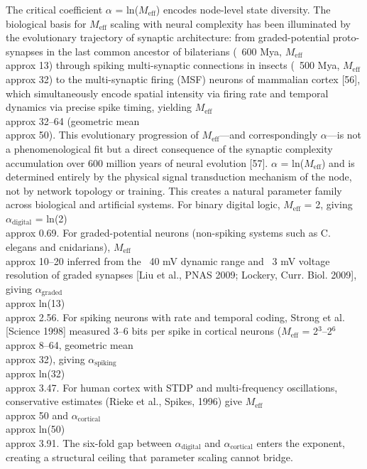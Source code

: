\documentclass[a4paper,12pt]{article}
\begin{document}
The critical coefficient $\alpha$ = ln($M_{\text{eff}}$) encodes node-level state diversity. The biological basis for $M_{\text{eff}}$ scaling with neural complexity has been illuminated by the evolutionary trajectory of synaptic architecture: from graded-potential proto-synapses in the last common ancestor of bilaterians (~600 Mya, $M_{\text{eff}}$  \\approx  13) through spiking multi-synaptic connections in insects (~500 Mya, $M_{\text{eff}}$  \\approx  32) to the multi-synaptic firing (MSF) neurons of mammalian cortex [56], which simultaneously encode spatial intensity via firing rate and temporal dynamics via precise spike timing, yielding $M_{\text{eff}}$  \\approx  32--64 (geometric mean  \\approx  50). This evolutionary progression of $M_{\text{eff}}$---and correspondingly $\alpha$---is not a phenomenological fit but a direct consequence of the synaptic complexity accumulation over 600 million years of neural evolution [57]. $\alpha$ = ln($M_{\text{eff}}$) and is determined entirely by the physical signal transduction mechanism of the node, not by network topology or training. This creates a natural parameter family across biological and artificial systems. For binary digital logic, $M_{\text{eff}}$ = 2, giving $\alpha_{\text{digital}}$ = ln(2)  \\approx  0.69. For graded-potential neurons (non-spiking systems such as C. elegans and cnidarians), $M_{\text{eff}}$  \\approx  10--20 inferred from the ~40 mV dynamic range and ~3 mV voltage resolution of graded synapses [Liu et al., PNAS 2009; Lockery, Curr. Biol. 2009], giving $\alpha_{\text{graded}}$  \\approx  ln(13)  \\approx  2.56. For spiking neurons with rate and temporal coding, Strong et al. [Science 1998] measured 3--6 bits per spike in cortical neurons ($M_{\text{eff}}$ = 2$^3$--2$^6$  \\approx  8--64, geometric mean  \\approx  32), giving $\alpha_{\text{spiking}}$  \\approx  ln(32)  \\approx  3.47. For human cortex with STDP and multi-frequency oscillations, conservative estimates (Rieke et al., Spikes, 1996) give $M_{\text{eff}}$  \\approx  50 and $\alpha_{\text{cortical}}$  \\approx  ln(50)  \\approx  3.91. The six-fold gap between $\alpha_{\text{digital}}$ and $\alpha_{\text{cortical}}$ enters the exponent, creating a structural ceiling that parameter scaling cannot bridge.
\end{document}
